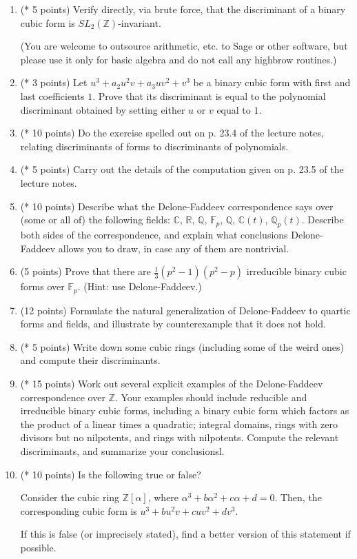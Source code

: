 \documentclass[12pt]{article}
\begin{document}
\begin{enumerate}
\item (* 5 points)
Verify directly, via brute force, that the discriminant of a binary cubic form is
$SL_2(\mathbb{Z})$-invariant.

(You are welcome to outsource arithmetic, etc. to Sage or other software, but please use it only
for basic algebra and do not call any highbrow routines.)

\item (* 3 points)
Let $u^3 + a_2 u^2 v + a_3 u v^2 + v^3$ be a binary cubic form with first and last coefficients $1$.
Prove that its discriminant is equal to the polynomial discriminant obtained by setting either $u$ or $v$
equal to $1$.

\item (* 10 points)
Do the exercise spelled out on p. 23.4 of the lecture notes, relating discriminants of forms to discriminants
of polynomials.

\item (* 5 points)
Carry out the details of the computation given on p. 23.5 of the lecture notes.

\item (* 10 points)
Describe what the Delone-Faddeev correspondence says over (some or all of) the following fields:
$\mathbb{C}$, $\mathbb{R}$, $\mathbb{Q}$, $\mathbb{F}_p$, $\mathbb{Q}$, $\mathbb{C}(t)$,
$\mathbb{Q}_p(t)$. Describe both sides of the correspondence, and explain what conclusions
Delone-Faddeev allows you to draw, in case any of them are nontrivial.

\item (5 points)
Prove that there are $\frac{1}{3} (p^2 - 1) (p^2 - p)$ irreducible binary cubic forms over
$\mathbb{F}_p$. (Hint: use Delone-Faddeev.)

\item (12 points)
Formulate the natural generalization of Delone-Faddeev to quartic forms and fields, and illustrate
by counterexample that it does not hold.

\item (* 5 points)
Write down some cubic rings (including some of the weird ones) and compute their discriminants.

\item (* 15 points)
Work out several explicit examples of the Delone-Faddeev correspondence over $\mathbb{Z}$. Your examples
should include reducible and irreducible binary cubic forms, including a binary cubic form which factors
as the product of a linear times a quadratic; integral domains, rings with zero divisors but
no nilpotents, and rings with nilpotents. Compute the relevant discriminants, and summarize your conclusionsl.

\item (* 10 points)
Is the following true or false?

Consider the cubic ring $\mathbb{Z}[\alpha]$, where $\alpha^3 + b \alpha^2 + c \alpha + d = 0$.
Then, the corresponding cubic form is $u^3 + b u^2 v + c u v^2 + d v^3$.

If this is false (or imprecisely stated), find a better version of this statement if possible. 

\end{enumerate}
\end{document}
